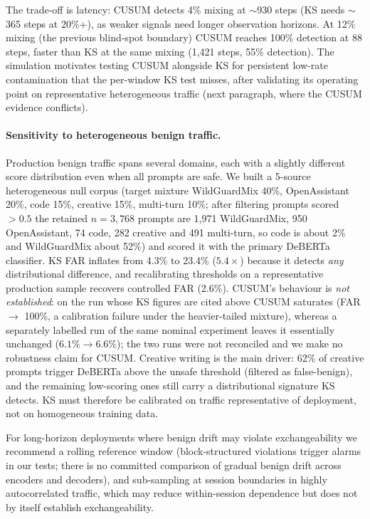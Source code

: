 \documentclass{article}
\begin{document}
The trade-off is latency: CUSUM detects 4\% mixing at ${\sim}$930 steps (KS needs ${\sim}$365 steps at 20\%+), as weaker signals need longer observation horizons. At 12\% mixing (the previous blind-spot boundary) CUSUM reaches 100\% detection at 88 steps, faster than KS at the same mixing (1{,}421 steps, 55\% detection). The simulation motivates testing CUSUM alongside KS for persistent low-rate contamination that the per-window KS test misses, after validating its operating point on representative heterogeneous traffic (next paragraph, where the CUSUM evidence conflicts).

\paragraph{Sensitivity to heterogeneous benign traffic.} Production benign traffic spans several domains, each with a slightly different score distribution even when all prompts are safe. We built a 5-source heterogeneous null corpus (target mixture WildGuardMix 40\%, OpenAssistant 20\%, code 15\%, creative 15\%, multi-turn 10\%; after filtering prompts scored $>0.5$ the retained $n{=}3{,}768$ prompts are 1{,}971 WildGuardMix, 950 OpenAssistant, 74 code, 282 creative and 491 multi-turn, so code is about 2\% and WildGuardMix about 52\%) and scored it with the primary DeBERTa classifier. KS FAR inflates from 4.3\% to 23.4\% ($5.4\times$) because it detects \emph{any} distributional difference, and recalibrating thresholds on a representative production sample recovers controlled FAR (2.6\%). CUSUM's behaviour is \emph{not established}: on the run whose KS figures are cited above CUSUM saturates (FAR $\to$ 100\%, a calibration failure under the heavier-tailed mixture), whereas a separately labelled run of the same nominal experiment leaves it essentially unchanged ($6.1\% \to 6.6\%$); the two runs were not reconciled and we make no robustness claim for CUSUM. Creative writing is the main driver: 62\% of creative prompts trigger DeBERTa above the unsafe threshold (filtered as false-benign), and the remaining low-scoring ones still carry a distributional signature KS detects. KS must therefore be calibrated on traffic representative of deployment, not on homogeneous training data.

For long-horizon deployments where benign drift may violate exchangeability we recommend a rolling reference window (block-structured violations trigger alarms in our tests; there is no committed comparison of gradual benign drift across encoders and decoders), and sub-sampling at session boundaries in highly autocorrelated traffic, which may reduce within-session dependence but does not by itself establish exchangeability.
\end{document}
